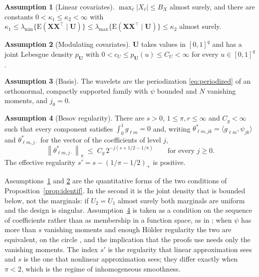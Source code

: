 \documentclass[12pt]{article} %
\theoremstyle{definition}
\newtheorem{assumption}{Assumption}
\theoremstyle{plain}
\newcommand{\E}{\mathrm{E}}
\newcommand{\T}{^{\top}}
\newcommand{\norm}[1]{\left\lVert #1 \right\rVert}
\newcommand{\inner}[2]{\langle #1, #2 \rangle}
\newcommand{\cv}{\ell}
\newcommand{\md}{m}
\newcommand{\lev}{j}
\newcommand{\tsl}{k}
\newcommand{\jzero}{j_{0}}
\newcommand{\bX}{\mathbf{X}}
\newcommand{\bU}{\mathbf{U}}
\newcommand{\gcomp}[2]{g_{#1#2}}
\newcommand{\wav}[2]{\psi_{#1#2}}
\newcommand{\coefs}[4]{\theta^{*}_{#1#2,#3#4}}
\newcommand{\seff}{s'}
\newcommand{\lmin}{\lambda_{\min}}
\newcommand{\lmaxx}{\lambda_{\max}}
\begin{document}
\begin{assumption}[Linear covariates]
\label{ass:X}
$\max_{\cv}|X_{\cv}| \le B_X$ almost surely, and there are constants
$0 < \kappa_1 \le \kappa_2 < \infty$ with
$\kappa_1 \le \lmin\{\E(\bX\bX\T\mid\bU)\} \le
\lmaxx\{\E(\bX\bX\T\mid\bU)\} \le \kappa_2$ almost surely.
\end{assumption}

\begin{assumption}[Modulating covariates]
\label{ass:U}
$\bU$ takes values in $[0,1]^q$ and has a joint Lebesgue density $p_{\bU}$
with $0 < c_U \le p_{\bU}(u) \le C_U < \infty$ for every $u \in [0,1]^q$.
\end{assumption}

\begin{assumption}[Basis]
\label{ass:basis}
The wavelets are the periodization \eqref{eq:periodized} of an orthonormal,
compactly supported family with $\psi$ bounded and $N$ vanishing moments, and
$\jzero = 0$.
\end{assumption}

\begin{assumption}[Besov regularity]
\label{ass:besov}
There are $s > 0$, $1 \le \pi, r \le \infty$ and $C_g < \infty$ such that
every component satisfies $\int_0^1 \gcomp{\cv}{\md} = 0$ and, writing
$\coefs{\cv}{\md}{\lev}{\tsl} = \inner{\gcomp{\cv}{\md}}{\wav{\lev}{\tsl}}$
and $\theta^{*}_{\cv\md,\lev\cdot}$ for the vector of the coefficients of
level $\lev$,
\[
  \norm{\theta^{*}_{\cv\md,\lev\cdot}}_{\pi} \;\le\;
  C_g\,2^{-\lev(s + 1/2 - 1/\pi)} \qquad \text{for every } \lev \ge 0 .
\]
The effective regularity $\seff = s - (1/\pi - 1/2)_{+}$ is positive.
\end{assumption}

Assumptions~\ref{ass:X} and \ref{ass:U} are the quantitative forms of the two
conditions of Proposition~\ref{prop:identif}. In the second it is the joint
density that is bounded below, not the marginals: if $U_2 = U_1$ almost surely
both marginals are uniform and the design is singular.
Assumption~\ref{ass:besov} is taken as a condition on the sequence of
coefficients rather than as membership in a function space, as in
\citet{Klopp-Pensky-2015}; when $\psi$ has more than $s$ vanishing moments and
enough Hölder regularity the two are equivalent, on the circle
\citep[Section 3.6]{Cohen-2003}, and the implication that the proofs use needs
only the vanishing moments. The index $\seff$ is the regularity that \textcolor{colR1}{linear
approximation} sees and $s$ is the one that nonlinear approximation sees; they differ
exactly when $\pi < 2$, which is the regime of inhomogeneous smoothness.
\end{document}
